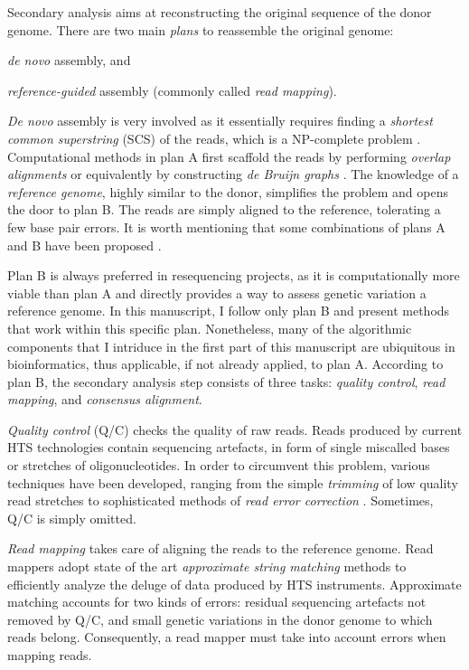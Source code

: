 Secondary analysis aims at reconstructing the original sequence of the donor genome.
There are two main \emph{plans} to reassemble the original genome: \begin{inparaenum}[(A)]
\item \emph{de novo} assembly, and
\item \emph{reference-guided} assembly (commonly called \emph{read mapping}).
\end{inparaenum}
\emph{De novo} assembly is very involved as it essentially requires finding a \emph{shortest common superstring} (SCS) of the reads, which is a NP-complete problem \citep{Maier1977,Gallant1980,Turner1989}.
Computational methods in plan A first scaffold the reads by performing \emph{overlap alignments} \citep{Myers2005} or equivalently by constructing \emph{de Bruijn graphs} \citep{Pevzner2001}.
The knowledge of a \emph{reference genome}, highly similar to the donor, simplifies the problem and opens the door to plan B.
The reads are simply aligned to the reference, tolerating a few base pair errors.
It is worth mentioning that some combinations of plans A and B have been proposed \citep{Li2012}.

Plan B is always preferred in resequencing projects, as it is computationally more viable than plan A and directly provides a way to assess genetic variation \wrt a reference genome.
In this manuscript, I follow only plan B and present methods that work within this specific plan.
Nonetheless, many of the algorithmic components that I intriduce in the first part of this manuscript are ubiquitous in bioinformatics, thus applicable, if not already applied, to plan A.
According to plan B, the secondary analysis step consists of three tasks: \emph{quality control}, \emph{read mapping}, and \emph{consensus alignment}.

\emph{Quality control} (Q/C) checks the quality of raw reads.
Reads produced by current HTS technologies contain sequencing artefacts, in form of single miscalled bases or stretches of oligonucleotides.
In order to circumvent this problem, various techniques have been developed, ranging from the simple \emph{trimming} of low quality read stretches to sophisticated methods of \emph{read error correction} \citep{Weese2013a}.
Sometimes, Q/C is simply omitted.

\emph{Read mapping} takes care of aligning the reads to the reference genome.
Read mappers adopt state of the art \emph{approximate string matching} methods to efficiently analyze the deluge of data produced by HTS instruments.
Approximate matching accounts for two kinds of errors:
residual sequencing artefacts not removed by Q/C, and small genetic variations in the donor genome to which reads belong.
Consequently, a read mapper must take into account errors when mapping reads.

